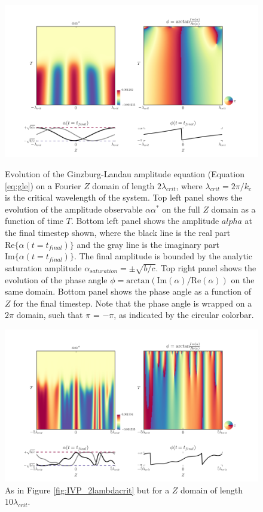 \documentclass{emulateapj}
\begin{document}
\begin{figure}[h!]
\centering
\includegraphics[width=\textwidth]{../figures/IVP_plot_thingap_AA_phase_2lambdacrit_2.png}
\caption{Evolution of the Ginzburg-Landau amplitude equation (Equation \ref{eq:gle}) on a Fourier $Z$ domain of length $2 \lambda_{crit}$, where $\lambda_{crit} = 2\pi/k_c$ is the critical wavelength of the system. Top left panel shows the evolution of the amplitude observable $\alpha \alpha^*$ on the full $Z$ domain as a function of time $T$. Bottom left panel shows the amplitude $alpha$ at the final timestep shown, where the black line is the real part $\mathrm{Re}\{\alpha(t = t_{final})\}$ and the gray line is the imaginary part $\mathrm{Im}\{\alpha(t = t_{final})\}$. The final amplitude is bounded by the analytic saturation amplitude $\alpha_{saturation} = \pm \sqrt{b/c}$. Top right panel shows the evolution of the phase angle $\phi = \mathrm{arctan} (\mathrm{Im}(\alpha)/\mathrm{Re}(\alpha))$ on the same domain. Bottom panel shows the phase angle as a function of $Z$ for the final timestep. Note that the phase angle is wrapped on a $2\pi$ domain, such that $\pi$ = $-\pi$, as indicated by the circular colorbar.}\label{fig:IVP_2lambdacrit}

\centering
\includegraphics[width=\textwidth]{../figures/IVP_plot_thingap_AA_phase_2lambdacrit_10.png}%
\caption{As in Figure \ref{fig:IVP_2lambdacrit} but for a $Z$ domain of length $10 \lambda_{crit}$.}\label{fig:IVP_10lambdacrit}
\end{figure}
\end{document}
